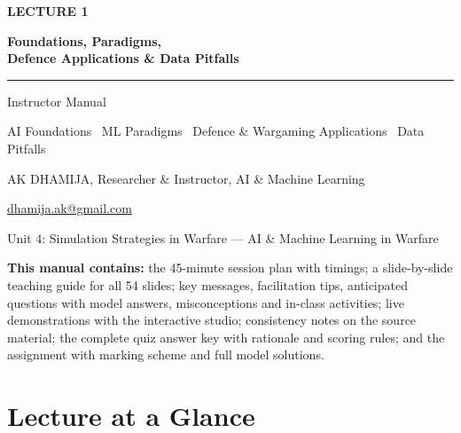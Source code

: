 \documentclass[11pt]{article}
\begin{document}
\begin{titlepage}\centering\vspace*{2.2cm}
{\color{AccN}\large\bfseries LECTURE 1\par}\vspace{0.6cm}
{\color{NavyN}\Huge\bfseries Foundations, Paradigms,\\Defence Applications \& Data Pitfalls\par}\vspace{0.6cm}
{\color{AccN}\rule{0.7\textwidth}{1.5pt}}\par\vspace{0.6cm}
{\LARGE Instructor Manual\par}\vspace{0.4cm}
{\large\begin{minipage}{0.85\textwidth}\centering AI Foundations \textbullet\ ML Paradigms \textbullet\ Defence \& Wargaming Applications \textbullet\ Data Pitfalls\end{minipage}\par}\vspace{2cm}
{\large AK DHAMIJA, Researcher \& Instructor, AI \& Machine Learning\par}\vspace{0.2cm}
{\normalsize \href{mailto:dhamija.ak@gmail.com}{dhamija.ak@gmail.com} \quad\textbullet{}\par}\vspace{0.3cm}
{Unit 4: Simulation Strategies in Warfare --- AI \& Machine Learning in Warfare\par}\vfill
\begin{tcolorbox}[colback=NavyN!4,colframe=NavyN,boxrule=0.6pt,arc=2pt,width=0.9\textwidth]\small
\textbf{This manual contains:} the 45-minute session plan with timings; a slide-by-slide teaching guide for all 54 slides; key messages, facilitation tips, anticipated questions with model answers, misconceptions and in-class activities; live demonstrations with the interactive studio; consistency notes on the source material; the complete quiz answer key with rationale and scoring rules; and the assignment with marking scheme and full model solutions.
\end{tcolorbox}
\end{titlepage}
\tableofcontents\newpage


\section{Lecture at a Glance}
\end{document}

